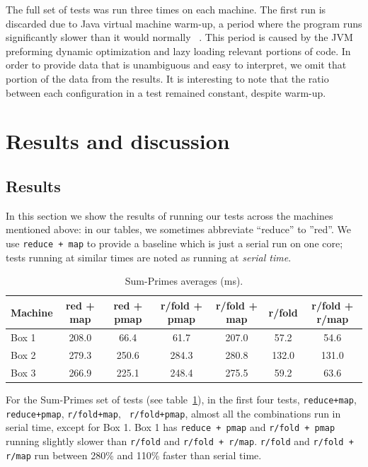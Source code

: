 \documentclass[12pt]{article}
\newcommand{\comment}[1]{{\bf \tt  {#1}}}
\newcommand{\emcomment}[1]{\textcolor{ForestGreen}{\comment{Elena: {#1}}}}
\newcommand{\clocode}[1]{{\texttt {#1}}}
\begin{document}
The full set of tests was run three times on each machine. The first run is discarded due to Java virtual machine warm-up, a period where the program runs significantly slower than it would normally~\cite{Blackburn:2008} . This period is caused by the JVM preforming dynamic optimization and lazy loading relevant portions of code. In order to provide data that is unambiguous and easy to interpret, we omit that portion of the data from the results. It is interesting to note that the ratio between each configuration in a test remained constant, despite warm-up.


\section{Results and discussion}\label{sec:results-disc}
\subsection{Results}\label{sec:results}
In this section we show the results of running our tests across the machines mentioned above: in our tables, we sometimes abbreviate ``reduce'' to ''red''. We use \clocode{reduce + map} to provide a baseline which is just a serial run on one core; tests running at similar times are noted as running at {\it serial time}.

\begin{table}[h!]
\begin{center}
\begin{tabular}{|l|c|c|c|c|c|c|}
\hline
Machine & red + map & red + pmap & r/fold + pmap & r/fold + map & r/fold & r/fold + r/map \\
\hline
Box 1 & 208.0 & 66.4 & 61.7 & 207.0 & 57.2 &  54.6 \\
Box 2 & 279.3 & 250.6 & 284.3 & 280.8 & 132.0 & 131.0 \\
Box 3 & 266.9 & 225.1 & 248.4 & 275.5 & 59.2 & 63.6 \\
\hline
\end{tabular}
\end{center}
\caption{Sum-Primes averages (ms).}\label{table:sum-primes}
\end{table}
For the Sum-Primes set of tests (see table~\ref{table:sum-primes}), in the first four tests, \clocode{reduce+map}, \clocode{reduce+pmap}, \clocode{r/fold+map}, \clocode{ r/fold+pmap}, almost all the combinations run in serial time, except for Box 1. Box 1 has \clocode{reduce + pmap} and \clocode{r/fold + pmap} running slightly slower than \clocode{r/fold} and \clocode{r/fold + r/map}. \clocode{r/fold} and \clocode{r/fold + r/map} run between 280\% and 110\% faster than serial time.
\end{document}
